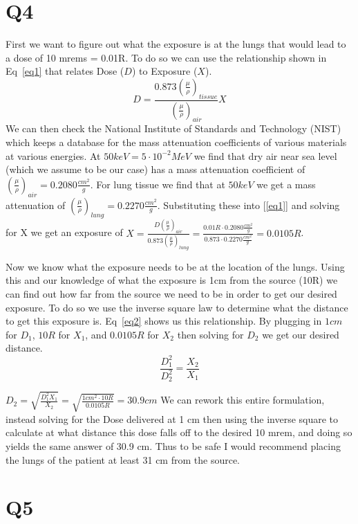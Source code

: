 \documentclass[12pt]{article}
\begin{document}
\section{Q4}
First we want to figure out what the exposure is at the lungs that would lead to a dose of 10 mrems = 0.01R. To do so we can use the relationship shown in Eq~\ref{eq1} that relates Dose ($D$) to Exposure ($X$).
\begin{equation}
D = \frac{0.873(\frac{\mu}{\rho})_{tissue}}{(\frac{\mu}{\rho})_{air}}X
\label{eq1}
\end{equation}
\noindent We can then check the National Institute of Standards and Technology (NIST) which keeps a database for the mass attenuation coefficients of various materials at various energies. At $50keV = 5\cdot10^{-2}MeV$ we find that dry air near sea level (which we assume to be our case) has a mass attenuation coefficient of $(\frac{\mu}{\rho})_{air} = 0.2080\frac{cm^2}{g}$. For lung tissue we find that at $50keV$ we get a mass attenuation of $(\frac{\mu}{\rho})_{lung} = 0.2270\frac{cm^2}{g}$. Substituting these into [\ref{eq1}] and solving for X we get an exposure of $X = \frac{D(\frac{\mu}{\rho})_{air}}{0.873(\frac{\mu}{\rho})_{lung} } = \frac{0.01 R \cdot 0.2080\frac{cm^2}{g}}{0.873\cdot 0.2270\frac{cm^2}{g}} = 0.0105 R$. 

\noindent Now we know what the exposure needs to be at the location of the lungs. Using this and our knowledge of what the exposure is 1cm from the source (10R) we can find out how far from the source we need to be in order to get  our desired exposure. To do so we use the inverse square law to determine what the distance to get this exposure is. Eq~\ref{eq2} shows us this relationship. By plugging in $1cm$ for $D_1$, $10R$ for $X_1$, and $0.0105R$ for $X_2$ then solving for $D_2$ we get our desired distance.
\begin{equation}
\frac{D_1^2}{D_2^2} = \frac{X_2}{X_1}
\label{eq2}
\end{equation}


\noindent $D_2 = \sqrt{\frac{D_1^2X_1}{X_2}} = \sqrt{\frac{1cm^2\cdot 10R}{0.0105R}} = 30.9 cm$ We can rework this entire formulation, instead solving for the Dose delivered at 1 cm then using the inverse square to calculate at what distance this dose falls off to the desired 10 mrem, and doing so yields the same answer of 30.9 cm. Thus to be safe I would recommend placing the lungs of the patient at least 31 cm from the source. 
\section{Q5}
\end{document}
